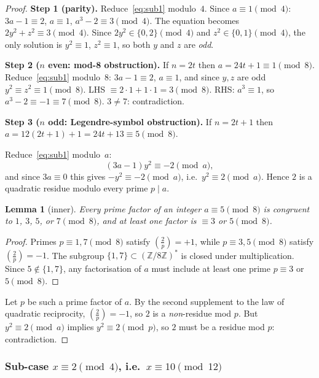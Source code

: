\documentclass[12pt,a4paper]{article}
\newtheorem{lemma}[theorem]{Lemma}
\theoremstyle{definition}
\newcommand{\Z}{\mathbb{Z}}
\begin{document}
\begin{proof}
\textbf{Step 1 (parity).}
Reduce~\eqref{eq:sub1} modulo~$4$.  Since $a\equiv 1\pmod 4$:
$3a-1\equiv 2$, $a\equiv 1$, $a^3-2\equiv 3\pmod 4$.
The equation becomes $2y^2+z^2\equiv 3\pmod 4$.
Since $2y^2\in\{0,2\}\pmod 4$ and $z^2\in\{0,1\}\pmod 4$,
the only solution is $y^2\equiv 1$, $z^2\equiv 1$,
so both $y$ and $z$ are \emph{odd}.

\textbf{Step 2 ($n$ even: mod-8 obstruction).}
If $n = 2t$ then $a = 24t+1\equiv 1\pmod 8$.
Reduce~\eqref{eq:sub1} modulo~$8$: $3a-1\equiv 2$, $a\equiv 1$,
and since $y,z$ are odd $y^2\equiv z^2\equiv 1\pmod 8$.
LHS $\equiv 2\cdot 1 + 1\cdot 1 = 3\pmod 8$.
RHS: $a^3\equiv 1$, so $a^3-2\equiv -1\equiv 7\pmod 8$.
$3 \neq 7$: contradiction.

\textbf{Step 3 ($n$ odd: Legendre-symbol obstruction).}
If $n = 2t+1$ then $a = 12(2t+1)+1 = 24t+13\equiv 5\pmod 8$.

Reduce~\eqref{eq:sub1} modulo~$a$:
\[
  (3a-1)y^2 \equiv -2 \pmod{a},
\]
and since $3a\equiv 0$ this gives $-y^2\equiv -2\pmod a$,
i.e.\ $y^2\equiv 2\pmod a$.
Hence $2$ is a quadratic residue modulo every prime $p\mid a$.

\begin{lemma}[inner]
  Every prime factor of an integer $a\equiv 5\pmod 8$
  is congruent to $1$, $3$, $5$, or $7\pmod 8$, and at least one factor is
  $\equiv 3$ or $5\pmod 8$.
\end{lemma}
\begin{proof}
  Primes $p\equiv 1,7\pmod 8$ satisfy $\left(\frac{2}{p}\right)=+1$,
  while $p\equiv 3,5\pmod 8$ satisfy $\left(\frac{2}{p}\right)=-1$.
  The subgroup $\{1,7\}\subset(\Z/8\Z)^*$ is closed under multiplication.
  Since $5\notin\{1,7\}$, any factorisation of $a$ must include at least one
  prime $p\equiv 3$ or $5\pmod 8$.
\end{proof}

Let $p$ be such a prime factor of $a$.
By the second supplement to the law of quadratic reciprocity,
$\left(\frac{2}{p}\right)=-1$, so $2$ is a \emph{non}-residue mod $p$.
But $y^2\equiv 2\pmod a$ implies $y^2\equiv 2\pmod p$, so $2$ must be a
residue mod $p$: contradiction.
\end{proof}

\subsubsection{Sub-case \texorpdfstring{$x \equiv 2 \pmod{4}$}{x ≡ 2 (mod 4)},
  i.e.\ \texorpdfstring{$x \equiv 10 \pmod{12}$}{x ≡ 10 (mod 12)}}
\label{sec:case1f}
\end{document}
